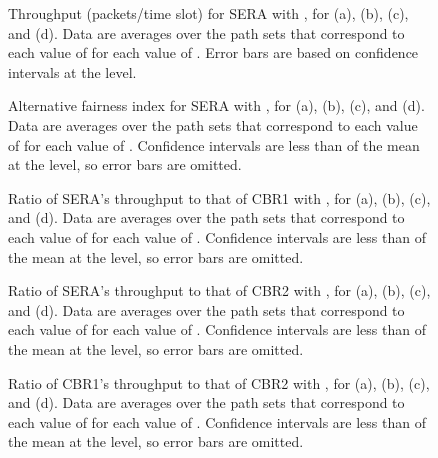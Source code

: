 \documentclass{article}
\begin{document}
\begin{figure}[p]
\centering
{}
\caption[Throughput (packets/time slot) for SERA]{Throughput (packets/time slot)
for SERA with , for  (a),  (b),  (c), and
 (d). Data are averages over the  path sets that correspond to
each value of  for each value of . Error bars are based on
confidence intervals at the  level.}
\label{figureS3}
\end{figure}

\begin{figure}[p]
\centering
{}
\caption[Alternative fairness index for SERA]{Alternative fairness index for
SERA with , for  (a),  (b),  (c), and
 (d). Data are averages over the  path sets that correspond to
each value of  for each value of . Confidence intervals are
less than  of the mean at the  level, so error bars are omitted.}
\label{figureS4}
\end{figure}

\begin{figure}[p]
\centering
{}
\caption[Ratio of SERA's throughput to that of CBR1]{Ratio of SERA's throughput
to that of CBR1 with , for  (a),  (b), 
(c), and  (d). Data are averages over the  path sets that
correspond to each value of  for each value of . Confidence
intervals are less than  of the mean at the  level, so error bars are
omitted.}
\label{figureS5}
\end{figure}

\begin{figure}[p]
\centering
{}
\caption[Ratio of SERA's throughput to that of CBR2]{Ratio of SERA's throughput
to that of CBR2 with , for  (a),  (b), 
(c), and  (d). Data are averages over the  path sets that
correspond to each value of  for each value of . Confidence
intervals are less than  of the mean at the  level, so error bars are
omitted.}
\label{figureS6}
\end{figure}

\begin{figure}[p]
\centering
{}
\caption[Ratio of CBR1's throughput to that of CBR2]{Ratio of CBR1's throughput
to that of CBR2 with , for  (a),  (b), 
(c), and  (d). Data are averages over the  path sets that
correspond to each value of  for each value of . Confidence
intervals are less than  of the mean at the  level, so error bars are
omitted.}
\label{figureS7}
\end{figure}
\end{document}
